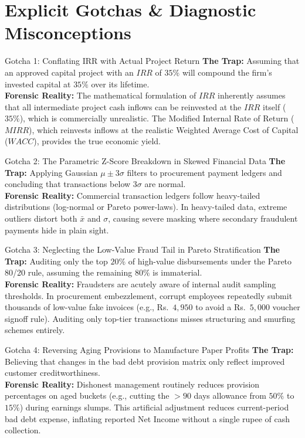 \section{Explicit Gotchas \& Diagnostic Misconceptions}

\begin{trapbox}{Gotcha 1: Conflating IRR with Actual Project Return}
\textbf{The Trap:} Assuming that an approved capital project with an $IRR$ of $35\%$ will compound the firm's invested capital at $35\%$ over its lifetime.\\
\textbf{Forensic Reality:} The mathematical formulation of $IRR$ inherently assumes that all intermediate project cash inflows can be reinvested at the $IRR$ itself ($35\%$), which is commercially unrealistic. The Modified Internal Rate of Return ($MIRR$), which reinvests inflows at the realistic Weighted Average Cost of Capital ($WACC$), provides the true economic yield.
\end{trapbox}

\begin{trapbox}{Gotcha 2: The Parametric Z-Score Breakdown in Skewed Financial Data}
\textbf{The Trap:} Applying Gaussian $\mu \pm 3\sigma$ filters to procurement payment ledgers and concluding that transactions below $3\sigma$ are normal.\\
\textbf{Forensic Reality:} Commercial transaction ledgers follow heavy-tailed distributions (log-normal or Pareto power-laws). In heavy-tailed data, extreme outliers distort both $\bar{x}$ and $\sigma$, causing severe masking where secondary fraudulent payments hide in plain sight.
\end{trapbox}

\begin{trapbox}{Gotcha 3: Neglecting the Low-Value Fraud Tail in Pareto Stratification}
\textbf{The Trap:} Auditing only the top $20\%$ of high-value disbursements under the Pareto 80/20 rule, assuming the remaining $80\%$ is immaterial.\\
\textbf{Forensic Reality:} Fraudsters are acutely aware of internal audit sampling thresholds. In procurement embezzlement, corrupt employees repeatedly submit thousands of low-value fake invoices (e.g., Rs.~$4{,}950$ to avoid a Rs.~$5{,}000$ voucher signoff rule). Auditing only top-tier transactions misses structuring and smurfing schemes entirely.
\end{trapbox}

\begin{trapbox}{Gotcha 4: Reversing Aging Provisions to Manufacture Paper Profits}
\textbf{The Trap:} Believing that changes in the bad debt provision matrix only reflect improved customer creditworthiness.\\
\textbf{Forensic Reality:} Dishonest management routinely reduces provision percentages on aged buckets (e.g., cutting the $>90$ days allowance from $50\%$ to $15\%$) during earnings slumps. This artificial adjustment reduces current-period bad debt expense, inflating reported Net Income without a single rupee of cash collection.
\end{trapbox}

